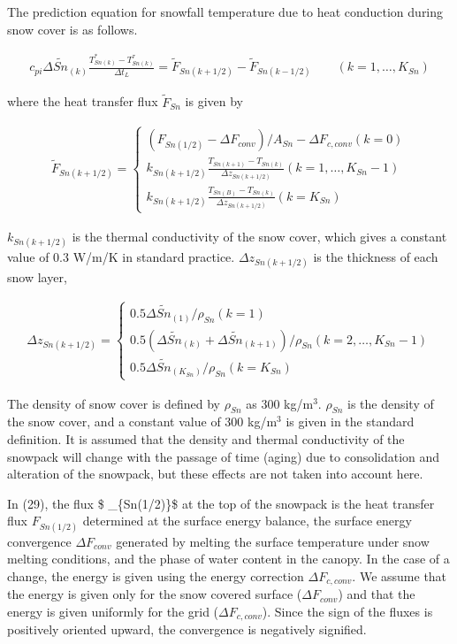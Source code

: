 The prediction equation for snowfall temperature due to heat conduction
during snow cover is as follows.

\begin{eqnarray}
c_{pi}\Delta \widetilde{Sn}_{(k)} \frac{T_{Sn(k)}^* - T_{Sn(k)}^{\tau}}{\Delta t_L} = \widetilde{F}_{Sn(k+1/2)} - \widetilde{F}_{Sn(k-1/2)}
\qquad (k=1,\ldots,K_{Sn})
\end{eqnarray}

where the heat transfer flux \(\widetilde{F}_{Sn}\) is given by

\begin{eqnarray}
 \widetilde{F}_{Sn(k+1/2)} =
\left\{
\begin{array}{ll}
( F_{Sn(1/2)} - \Delta F_{conv})/A_{Sn} - \Delta F_{c,conv}
 (k=0)\\
\displaystyle{
k_{Sn(k+1/2)} \frac{T_{Sn(k+1)} - T_{Sn(k)}}{\Delta z_{Sn(k+1/2)}}
}
 (k=1,\ldots,K_{Sn}-1) \\
\displaystyle{
k_{Sn(k+1/2)} \frac{T_{Sn(B)} - T_{Sn(k)}}{\Delta z_{Sn(k+1/2)}}
}
 (k=K_{Sn})
\end{array}
\right. 
\end{eqnarray}

\(k_{Sn(k+1/2)}\) is the thermal conductivity of the snow cover, which
gives a constant value of 0.3 W/m/K in standard practice.
\(\Delta z_{Sn(k+1/2)}\) is the thickness of each snow layer,

\begin{eqnarray}
 \Delta z_{Sn(k+1/2)} =
\left\{
\begin{array}{ll}
 0.5 \Delta \widetilde{Sn}_{(1)} / \rho_{Sn}  (k=1)\\
 0.5 (\Delta \widetilde{Sn}_{(k)}+\Delta \widetilde{Sn}_{(k+1)}) / \rho_{Sn}
 (k=2,\ldots,K_{Sn}-1)\\
 0.5 \Delta \widetilde{Sn}_{(K_{Sn})} / \rho_{Sn}  (k=K_{Sn})
\end{array}
\right.
\end{eqnarray}

The density of snow cover is defined by \(\rho_{Sn}\) as 300 kg/m\(^3\).
\(\rho_{Sn}\) is the density of the snow cover, and a constant value of
300 kg/m\(^3\) is given in the standard definition. It is assumed that
the density and thermal conductivity of the snowpack will change with
the passage of time (aging) due to consolidation and alteration of the
snowpack, but these effects are not taken into account here.

In (29), the flux \$ \_\{Sn(1/2)\}\$ at the top of the
snowpack is the heat transfer flux \(F_{Sn(1/2)}\) determined at the
surface energy balance, the surface energy convergence
\(\Delta F_{conv}\) generated by melting the surface temperature under
snow melting conditions, and the phase of water content in the canopy.
In the case of a change, the energy is given using the energy correction
\(\Delta F_{c,conv}\). We assume that the energy is given only for the
snow covered surface (\(\Delta F_{conv}\)) and that the energy is given
uniformly for the grid (\(\Delta F_{c,conv}\)). Since the sign of the
fluxes is positively oriented upward, the convergence is negatively
signified.

